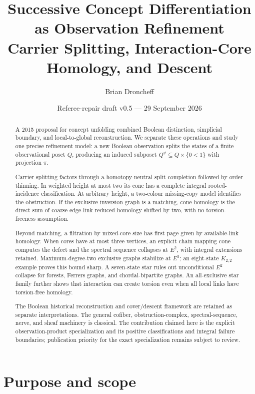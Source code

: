 \documentclass[11pt]{article}
\title{\textbf{Successive Concept Differentiation as Observation Refinement}\\
\large Carrier Splitting, Interaction-Core Homology, and Descent}
\author{Brian Droncheff}
\date{Referee-repair draft v0.5 --- 29 September 2026}
\begin{document}
\maketitle

\begin{abstract}
A 2015 proposal for concept unfolding combined Boolean distinction, simplicial
boundary, and local-to-global reconstruction.  We separate these operations
and study one precise refinement model: a new Boolean observation splits the
states of a finite observational poset $Q$, producing an induced subposet
$Q^\psi\subseteq Q\times\{0<1\}$ with projection $\pi$.

Carrier splitting factors through a homotopy-neutral split completion followed
by order thinning.  In weighted height at most two its cone has a complete
integral rooted-incidence classification.  At arbitrary height, a two-colour
missing-copy model identifies the obstruction.  If the exclusive inversion
graph is a matching, cone homology is the direct sum of coarse edge-link
reduced homology shifted by two, with no torsion-freeness assumption.

Beyond matching, a filtration by mixed-core size has first page given by
available-link homology.  When cores have at most three vertices, an explicit
chain mapping cone computes the defect and the spectral sequence collapses at
$E^2$, with integral extensions retained.  Maximum-degree-two exclusive graphs
stabilize at $E^3$; an eight-state $K_{2,2}$ example proves this bound sharp.
A seven-state star rules out unconditional $E^2$ collapse for forests, Ferrers
graphs, and chordal-bipartite graphs.  An all-exclusive star family further
shows that interaction can create torsion even when all local links have
torsion-free homology.

The Boolean historical reconstruction and cover/descent framework are retained
as separate interpretations.  The general cofiber, obstruction-complex,
spectral-sequence, nerve, and sheaf machinery is classical.  The contribution
claimed here is the explicit observation-product specialization and its
positive classifications and integral failure boundaries; publication priority
for the exact specialization remains subject to review.

\end{abstract}

\tableofcontents

\section{Purpose and scope}
\end{document}
